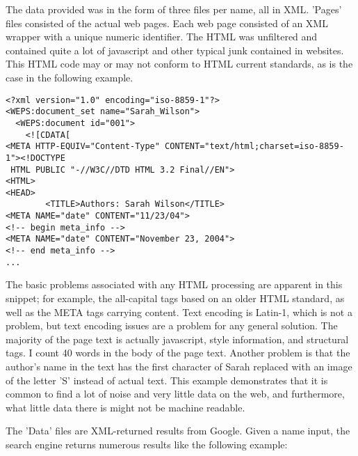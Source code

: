 \documentclass[12pt,twoside,letterpaper]{article}
\begin{document}
The data provided was in the form of three files per name, all in XML. 'Pages' files consisted of the actual web pages. Each web page consisted of an XML wrapper with a unique numeric identifier. The HTML was unfiltered and contained quite a lot of javascript and other typical junk contained in websites. This HTML code may or may not conform to HTML current standards, as is the case in the following example.

\begin{verbatim}
<?xml version="1.0" encoding="iso-8859-1"?>
<WEPS:document_set name="Sarah_Wilson">
  <WEPS:document id="001">
    <![CDATA[
<META HTTP-EQUIV="Content-Type" CONTENT="text/html;charset=iso-8859-1"><!DOCTYPE
 HTML PUBLIC "-//W3C//DTD HTML 3.2 Final//EN">
<HTML>
<HEAD>
        <TITLE>Authors: Sarah Wilson</TITLE>
<META NAME="date" CONTENT="11/23/04">
<!-- begin meta_info -->
<META NAME="date" CONTENT="November 23, 2004">
<!-- end meta_info -->
...
\end{verbatim}

The basic problems associated with any HTML processing are apparent in this snippet; for example, the all-capital tags based on an older HTML standard, as well as the META tags carrying content. Text encoding is Latin-1, which is not a problem, but text encoding issues are a problem for any general solution. The majority of the page text is actually javascript, style information, and structural tags. I count 40 words in the body of the page text. Another problem is that the author's name in the text has the first character of Sarah replaced with an image of the letter 'S' instead of actual text. This example demonstrates that it is common to find a lot of noise and very little data on the web, and furthermore, what little data there is might not be machine readable. 

The 'Data' files are XML-returned results from Google. Given a name input, the search engine returns numerous results like the following example: 
\end{document}
